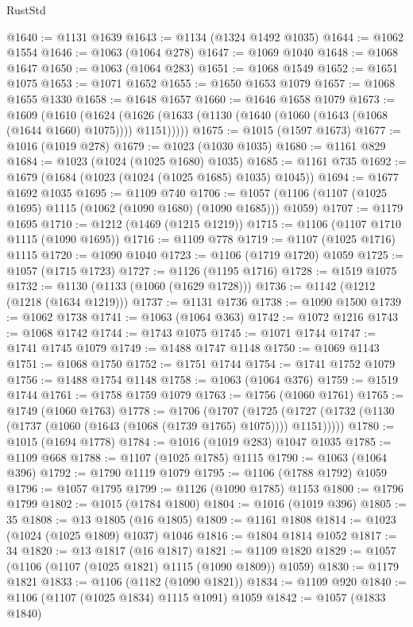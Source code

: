 \begin{lexlean}{RustStd}
\begin{coremodule}
{\begin{coremodule}
{{{{{{{{{{{{{{{{{{{{{{{{{{{{{{{{{{{@1640 := @1131 @1639
@1643 := @1134 (@1324 @1492 @1035)
@1644 := @1062 @1554
@1646 := @1063 (@1064 @278)
@1647 := @1069 @1040
@1648 := @1068 @1647
@1650 := @1063 (@1064 @283)
@1651 := @1068 @1549
@1652 := @1651 @1075
@1653 := @1071 @1652
@1655 := @1650 @1653 @1079
@1657 := @1068 @1655 @1330
@1658 := @1648 @1657
@1660 := @1646 @1658 @1079
@1673 := @1609
    (@1610
      (@1624 (@1626 (@1633 (@1130 (@1640 (@1060 (@1643 (@1068 (@1644 @1660) @1075)))) @1151)))))
@1675 := @1015 (@1597 @1673)
@1677 := @1016 (@1019 @278)
@1679 := @1023 (@1030 @1035)
@1680 := @1161 @829
@1684 := @1023 (@1024 (@1025 @1680) @1035)
@1685 := @1161 @735
@1692 := @1679 (@1684 (@1023 (@1024 (@1025 @1685) @1035) @1045))
@1694 := @1677 @1692 @1035
@1695 := @1109 @740
@1706 := @1057 (@1106 (@1107 (@1025 @1695) @1115 (@1062 (@1090 @1680) (@1090 @1685))) @1059)
@1707 := @1179 @1695
@1710 := @1212 (@1469 (@1215 @1219))
@1715 := @1106 (@1107 @1710 @1115 (@1090 @1695))
@1716 := @1109 @778
@1719 := @1107 (@1025 @1716) @1115
@1720 := @1090 @1040
@1723 := @1106 (@1719 @1720) @1059
@1725 := @1057 (@1715 @1723)
@1727 := @1126 (@1195 @1716)
@1728 := @1519 @1075
@1732 := @1130 (@1133 (@1060 (@1629 @1728)))
@1736 := @1142 (@1212 (@1218 (@1634 @1219)))
@1737 := @1131 @1736
@1738 := @1090 @1500
@1739 := @1062 @1738
@1741 := @1063 (@1064 @363)
@1742 := @1072 @1216
@1743 := @1068 @1742
@1744 := @1743 @1075
@1745 := @1071 @1744
@1747 := @1741 @1745 @1079
@1749 := @1488 @1747 @1148
@1750 := @1069 @1143
@1751 := @1068 @1750
@1752 := @1751 @1744
@1754 := @1741 @1752 @1079
@1756 := @1488 @1754 @1148
@1758 := @1063 (@1064 @376)
@1759 := @1519 @1744
@1761 := @1758 @1759 @1079
@1763 := @1756 (@1060 @1761)
@1765 := @1749 (@1060 @1763)
@1778 := @1706
    (@1707
      (@1725 (@1727 (@1732 (@1130 (@1737 (@1060 (@1643 (@1068 (@1739 @1765) @1075)))) @1151)))))
@1780 := @1015 (@1694 @1778)
@1784 := @1016 (@1019 @283) @1047 @1035
@1785 := @1109 @668
@1788 := @1107 (@1025 @1785) @1115
@1790 := @1063 (@1064 @396)
@1792 := @1790 @1119 @1079
@1795 := @1106 (@1788 @1792) @1059
@1796 := @1057 @1795
@1799 := @1126 (@1090 @1785) @1153
@1800 := @1796 @1799
@1802 := @1015 (@1784 @1800)
@1804 := @1016 (@1019 @396)
@1805 := 35
@1808 := @13 @1805 (@16 @1805)
@1809 := @1161 @1808
@1814 := @1023 (@1024 (@1025 @1809) @1037) @1046
@1816 := @1804 @1814 @1052
@1817 := 34
@1820 := @13 @1817 (@16 @1817)
@1821 := @1109 @1820
@1829 := @1057 (@1106 (@1107 (@1025 @1821) @1115 (@1090 @1809)) @1059)
@1830 := @1179 @1821
@1833 := @1106 (@1182 (@1090 @1821))
@1834 := @1109 @920
@1840 := @1106 (@1107 (@1025 @1834) @1115 @1091) @1059
@1842 := @1057 (@1833 @1840)
}}}}}}}}}}}}}}}}}}}}}}}}}}}}}}}}}}}
\end{coremodule}}
\end{coremodule}
\end{lexlean}
